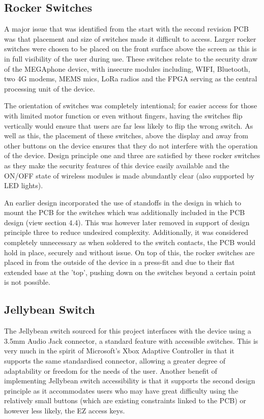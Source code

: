\subsection{Rocker Switches}

A major issue that was identified from the start with the second revision PCB was that placement and size of switches made it difficult to access.
Larger rocker switches were chosen to be placed on the front surface above the screen as this is in full visibility of the user during use.
These switches relate to the security draw of the MEGAphone device, with insecure modules including, WIFI, Bluetooth, two 4G modems, MEMS mics, LoRa radios and the FPGA serving as the central processing unit of the device.

The orientation of switches was completely intentional; for easier access for those with limited motor function or even without fingers, having the switches flip vertically would ensure that users are far less likely to flip the wrong switch.
As well as this, the placement of these switches, above the display and away from other buttons on the device ensures that they do not interfere with the operation of the device.
Design principle one and three are satisfied by these rocker switches as they make the security features of this device easily available and the ON/OFF state of wireless modules is made abundantly clear (also supported by LED lights).

An earlier design incorporated the use of standoffs in the design in which to mount the PCB for the switches which was additionally included in the PCB design (view section 4.4). %
This was however later removed in support of design principle three to reduce undesired complexity.
Additionally, it was considered completely unnecessary as when soldered to the switch contacts, the PCB would hold in place, securely and without issue.
On top of this, the rocker switches are placed in from the outside of the device in a press-fit and due to their flat extended base at the 'top', pushing down on the switches beyond a certain point is not possible.

\subsection{Jellybean Switch}

The Jellybean switch sourced for this project interfaces with the device using a 3.5mm Audio Jack connector, a standard feature with accessible switches.
This is very much in the spirit of Microsoft's Xbox Adaptive Controller\cite{adaptive} in that it supports the same standardised connector, allowing a greater degree of adaptability or freedom for the needs of the user.
Another benefit of implementing Jellybean switch accessibility is that it supports the second design principle as it accommodates users who may have great difficulty using the relatively small buttons (which are existing constraints linked to the PCB) or however less likely, the EZ access keys.

